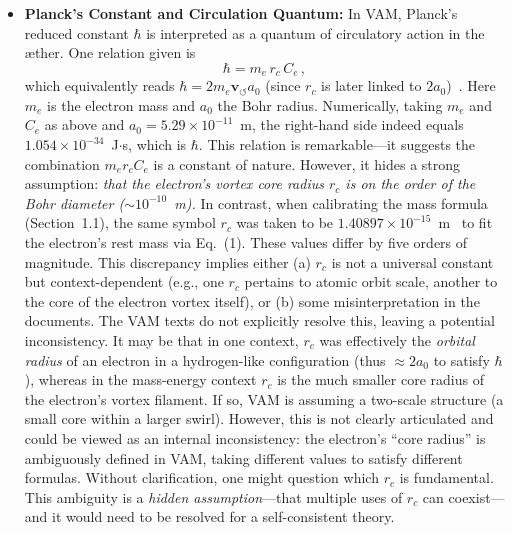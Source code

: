 \documentclass[a4paper,12pt]{article}
\begin{document}
\begin{itemize}
\item 
\textbf{Planck's Constant and Circulation Quantum:} In VAM, Planck's reduced constant $\hbar$ is interpreted as a quantum of circulatory action in the æther. One relation given is
\begin{equation}
    \hbar = m_e\, r_c\, C_e\,,
\end{equation}
which equivalently reads $\hbar = 2 m_e \mathbf{v}_{\scriptscriptstyle\boldsymbol{\circlearrowleft}} a_0$ (since $r_c$ is later linked to $2a_0$)~\cite{vamcore}. Here $m_e$ is the electron mass and $a_0$ the Bohr radius. Numerically, taking $m_e$ and $C_e$ as above and $a_0=5.29\times10^{-11}$~m, the right-hand side indeed equals $1.054\times10^{-34}$~J$\cdot$s, which is $\hbar$. This relation is remarkable---it suggests the combination $m_e r_c C_e$ is a constant of nature. However, it hides a strong assumption: \textit{that the electron's vortex core radius $r_c$ is on the order of the Bohr diameter ($\sim10^{-10}$~m).} In contrast, when calibrating the mass formula (Section~1.1), the same symbol $r_c$ was taken to be $1.40897\times10^{-15}$~m~\cite{vamfit} to fit the electron's rest mass via Eq.~(1). These values differ by five orders of magnitude. This discrepancy implies either (a) $r_c$ is not a universal constant but context-dependent (e.g., one $r_c$ pertains to atomic orbit scale, another to the core of the electron vortex itself), or (b) some misinterpretation in the documents. The VAM texts do not explicitly resolve this, leaving a potential inconsistency. It may be that in one context, $r_c$ was effectively the \textit{orbital radius} of an electron in a hydrogen-like configuration (thus $\approx 2a_0$ to satisfy $\hbar$), whereas in the mass-energy context $r_c$ is the much smaller core radius of the electron's vortex filament. If so, VAM is assuming a two-scale structure (a small core within a larger swirl). However, this is not clearly articulated and could be viewed as an internal inconsistency: the electron's ``core radius'' is ambiguously defined in VAM, taking different values to satisfy different formulas. Without clarification, one might question which $r_c$ is fundamental. This ambiguity is a \textit{hidden assumption}---that multiple uses of $r_c$ can coexist---and it would need to be resolved for a self-consistent theory.


\end{itemize}
\end{document}
